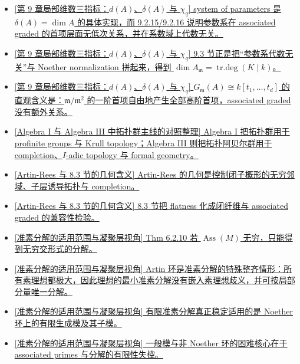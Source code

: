 \documentclass[a4paper]{ctexart}
\theoremstyle{definition}
\theoremstyle{analysis}
\theoremstyle{plain}
\begin{document}
\begin{itemize}
  \item \hyperref[subsec:topic-local-dimension-invariants]{[第 9 章局部维数三指标：\(d(A)\)、\(\delta(A)\) 与 \(\chi_q\)] system of parameters 是 \(\delta(A)=\dim A\) 的具体实现，而 9.2.15/9.2.16 说明参数系在 associated graded 的首项层面无低次关系，并在系数域上代数无关。}
  \item \hyperref[subsec:topic-local-dimension-invariants]{[第 9 章局部维数三指标：\(d(A)\)、\(\delta(A)\) 与 \(\chi_q\)] 9.3 节正是把“参数系代数无关”与 Noether normalization 拼起来，得到 \(\dim A_{\mathfrak m}=\operatorname{tr.deg}(K\mid k)\)。}
  \item \hyperref[rem:regular-graded-intuition]{[\hyperref[subsec:topic-local-dimension-invariants]{第 9 章局部维数三指标：\(d(A)\)、\(\delta(A)\) 与 \(\chi_q\)}] \(G_{\mathfrak m}(A)\cong k[t_1,\dots,t_d]\) 的直观含义是：\(\mathfrak m/\mathfrak m^2\) 的一阶首项自由地产生全部高阶首项，associated graded 没有额外关系。}
  \item \hyperref[rem:topological-groups-comparison]{[\hyperref[subsec:topic-topological-groups]{Algebra I 与 Algebra III 中拓扑群主线的对照整理}] Algebra I 把拓扑群用于 profinite groups 与 Krull topology；Algebra III 则把拓扑阿贝尔群用于 completion、\(I\)-adic topology 与 formal geometry。}
  \item \hyperref[rem:artin-rees-geometry]{[\hyperref[subsec:topic-artin-rees-geometry]{Artin-Rees 与 8.3 节的几何含义}] Artin-Rees 的几何是控制闭子概形的无穷邻域、子层诱导拓扑与 completion。}
  \item \hyperref[rem:local-flatness-geometry]{[\hyperref[subsec:topic-artin-rees-geometry]{Artin-Rees 与 8.3 节的几何含义}] 8.3 节把 flatness 化成闭纤维与 associated graded 的兼容性检验。}
  \item \hyperref[rem:primary-thm6210]{[\hyperref[subsec:topic-primary-coherent]{准素分解的适用范围与凝聚层视角}] Thm 6.2.10 若 \(\operatorname{Ass}(M)\) 无穷，只能得到无穷交形式的分解。}
  \item \hyperref[rem:artin-primary-unique]{[\hyperref[subsec:topic-primary-coherent]{准素分解的适用范围与凝聚层视角}] Artin 环是准素分解的特殊整齐情形：所有素理想都极大，因此理想的最小准素分解没有嵌入素理想歧义，并可按局部分量唯一分解。}
  \item \hyperref[rem:primary-cor6211]{[\hyperref[subsec:topic-primary-coherent]{准素分解的适用范围与凝聚层视角}] 有限准素分解真正稳定适用的是 Noether 环上的有限生成模及其子模。}
  \item \hyperref[rem:primary-finiteness-failure]{[\hyperref[subsec:topic-primary-coherent]{准素分解的适用范围与凝聚层视角}] 一般模与非 Noether 环的困难核心在于 associated primes 与分解的有限性失控。}

\end{itemize}
\end{document}
